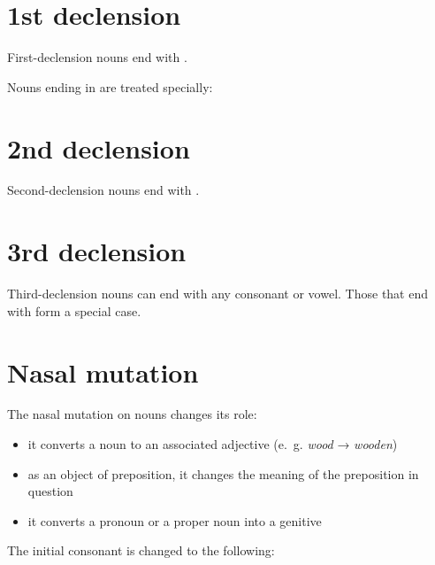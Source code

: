 \documentclass{book}
\begin{document}
\section{1st declension}

First-declension nouns end with .


Nouns ending in  are treated specially:


\section{2nd declension}

Second-declension nouns end with .


\section{3rd declension}

Third-declension nouns can end with any consonant or vowel. Those that end with  form a special case.







\section{Nasal mutation}

The nasal mutation on nouns changes its role:

\begin{itemize}
    \item it converts a noun to an associated adjective (e.~g. \emph{wood} → \emph{wooden})
    \item as an object of preposition, it changes the meaning of the preposition in question
    \item it converts a pronoun or a proper noun into a genitive
\end{itemize}

The initial consonant is changed to the following:
\end{document}
